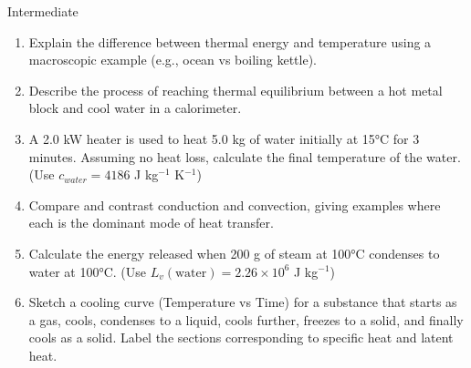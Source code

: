 \begin{tieredquestions}{Intermediate}
\begin{enumerate}
    \item Explain the difference between thermal energy and temperature using a macroscopic example (e.g., ocean vs boiling kettle).
    \item Describe the process of reaching thermal equilibrium between a hot metal block and cool water in a calorimeter.
    \item A 2.0 kW heater is used to heat 5.0 kg of water initially at 15°C for 3 minutes. Assuming no heat loss, calculate the final temperature of the water. (Use \(c_{water} = 4186\) J kg\(^{-1}\) K\(^{-1}\))
    \item Compare and contrast conduction and convection, giving examples where each is the dominant mode of heat transfer.
    \item Calculate the energy released when 200 g of steam at 100°C condenses to water at 100°C. (Use \(L_v(\text{water}) = 2.26 \times 10^6\) J kg\(^{-1}\))
    \item Sketch a cooling curve (Temperature vs Time) for a substance that starts as a gas, cools, condenses to a liquid, cools further, freezes to a solid, and finally cools as a solid. Label the sections corresponding to specific heat and latent heat.
\end{enumerate}
\end{tieredquestions}

